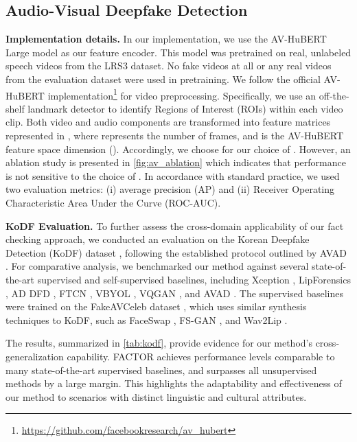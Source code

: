 \documentclass{article} \usepackage{iclr2024_conference,times}
\begin{document}
\subsection{Audio-Visual Deepfake Detection}
\label{app:av}

\textbf{Implementation details.}
In our implementation, we use the AV-HuBERT Large model as our feature encoder. This model was pretrained on real, unlabeled speech videos from the LRS3 dataset. No fake videos at all or any real videos from the evaluation dataset were used in pretraining. We follow the official AV-HuBERT implementation\footnote{\url{https://github.com/facebookresearch/av_hubert}} for video preprocessing. Specifically, we use an off-the-shelf landmark detector to identify Regions of Interest (ROIs) within each video clip. Both video and audio components are transformed into feature matrices represented in , where  represents the number of frames, and  is the AV-HuBERT feature space dimension (). Accordingly, we choose  for our choice of . However, an ablation study is presented in \cref{fig:av_ablation} which indicates that performance is not sensitive to the choice of . In accordance with standard practice, we used two evaluation metrics: (i) average precision (AP) and (ii) Receiver Operating Characteristic Area Under the Curve (ROC-AUC). 

\textbf{KoDF Evaluation.} To further assess the cross-domain applicability of our fact checking approach, we conducted an evaluation on the Korean Deepfake Detection (KoDF) dataset \citep{kodf}, following the established protocol outlined by AVAD \citep{owens}. For comparative analysis, we benchmarked our method against several state-of-the-art supervised and self-supervised baselines, including Xception \citep{learning3_ff++}, LipForensics \citep{lip_forensics}, AD DFD \citep{AD_DFD}, FTCN \citep{ftcn}, VBYOL \citep{byol,real_forensics}, VQGAN \citep{vqgan}, and AVAD \citep{owens}. The supervised baselines were trained on the FakeAVCeleb dataset \citep{fakeavceleb}, which uses similar synthesis techniques to KoDF, such as FaceSwap \citep{faceswap}, FS-GAN \citep{faceswap4}, and Wav2Lip \citep{wav2lip}.

The results, summarized in \cref{tab:kodf}, provide evidence for our method's cross-generalization capability. FACTOR achieves performance levels comparable to many state-of-the-art supervised baselines, and surpasses all unsupervised methods by a large margin. This highlights the adaptability and effectiveness of our method to scenarios with distinct linguistic and cultural attributes.
\end{document}
